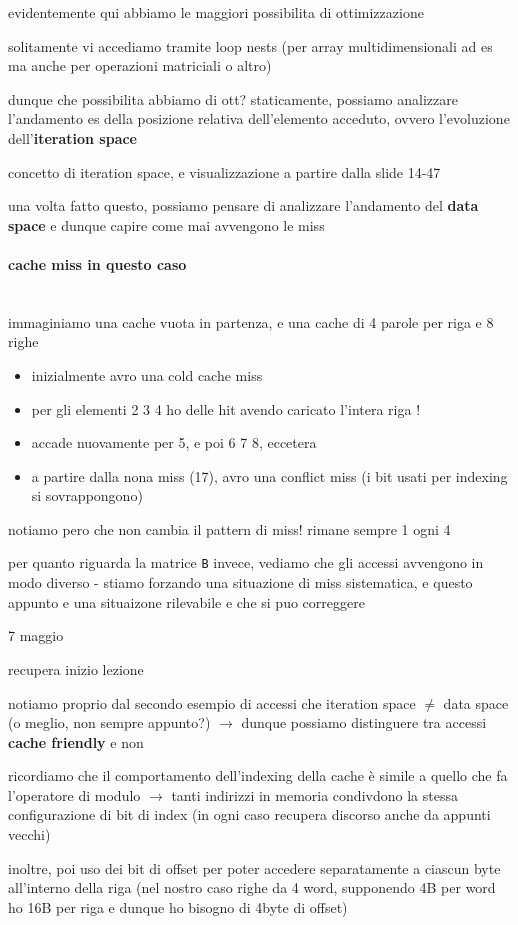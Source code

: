 evidentemente qui abbiamo le maggiori possibilita di ottimizzazione

solitamente vi accediamo tramite loop nests (per array multidimensionali ad es ma anche per operazioni matriciali o altro)

dunque che possibilita abbiamo di ott? staticamente, possiamo analizzare l'andamento es della posizione relativa dell'elemento acceduto, ovvero l'evoluzione dell'\textbf{iteration space}

concetto di iteration space, e visualizzazione a partire dalla slide 14-47

una volta fatto questo, possiamo pensare di analizzare l'andamento del \textbf{data space} e dunque capire come mai avvengono le miss

\paragraph{cache miss in questo caso}~\\

immaginiamo una cache vuota in partenza, e una cache di 4 parole per riga e 8 righe
\begin{itemize}
  \item inizialmente avro una cold cache miss
  \item per gli elementi 2 3 4 ho delle hit avendo caricato l'intera riga !
  \item accade nuovamente per 5, e poi 6 7 8, eccetera
  \item a partire dalla nona miss (17), avro una conflict miss (i bit usati per indexing si sovrappongono)
\end{itemize}
notiamo pero che non cambia il pattern di miss! rimane sempre 1 ogni 4

per quanto riguarda la matrice \lstinline|B| invece, vediamo che gli accessi avvengono in modo diverso - stiamo forzando una situazione di miss sistematica, e questo appunto e una situaizone rilevabile e che si puo correggere

7 maggio

recupera inizio lezione

notiamo proprio dal secondo esempio di accessi che iteration space $\neq$ data space (o meglio, non sempre appunto?) $\rightarrow$ dunque possiamo distinguere tra accessi \textbf{cache friendly} e non

\begin{emphasize}
  ricordiamo che il comportamento dell'indexing della cache \`e simile a quello che fa l'operatore di modulo $\rightarrow$ tanti indirizzi in memoria condivdono la stessa configurazione di bit di index (in ogni caso recupera discorso anche da appunti vecchi)

  inoltre, poi uso dei bit di offset per poter accedere separatamente a ciascun byte all'interno della riga (nel nostro caso righe da 4 word, supponendo 4B per word ho 16B per riga e dunque ho bisogno di 4byte di offset)
\end{emphasize}


